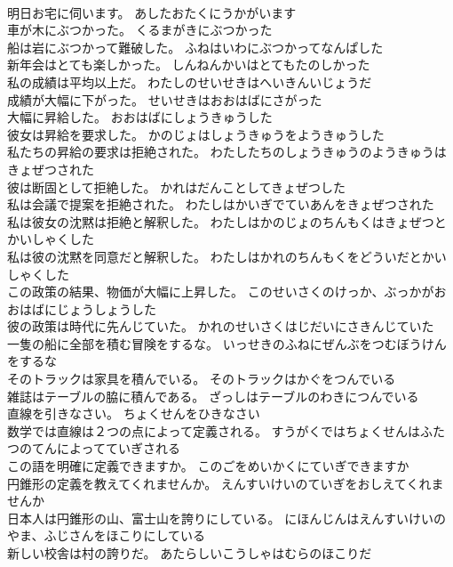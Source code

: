 \documentclass[8pt]{extreport}
\begin{document}
\begin{CJK}{UTF8}{min}
\\	明日お宅に伺います。	あしたおたくにうかがいます 
\\	車が木にぶつかった。	くるまがきにぶつかった 
\\	船は岩にぶつかって難破した。	ふねはいわにぶつかってなんぱした 
\\	新年会はとても楽しかった。	しんねんかいはとてもたのしかった 
\\	私の成績は平均以上だ。	わたしのせいせきはへいきんいじょうだ 
\\	成績が大幅に下がった。	せいせきはおおはばにさがった 
\\	大幅に昇給した。	おおはばにしょうきゅうした 
\\	彼女は昇給を要求した。	かのじょはしょうきゅうをようきゅうした 
\\	私たちの昇給の要求は拒絶された。	わたしたちのしょうきゅうのようきゅうはきょぜつされた 
\\	彼は断固として拒絶した。	かれはだんことしてきょぜつした 
\\	私は会議で提案を拒絶された。	わたしはかいぎでていあんをきょぜつされた 
\\	私は彼女の沈黙は拒絶と解釈した。	わたしはかのじょのちんもくはきょぜつとかいしゃくした 
\\	私は彼の沈黙を同意だと解釈した。	わたしはかれのちんもくをどういだとかいしゃくした 
\\	この政策の結果、物価が大幅に上昇した。	このせいさくのけっか、ぶっかがおおはばにじょうしょうした 
\\	彼の政策は時代に先んじていた。	かれのせいさくはじだいにさきんじていた 
\\	一隻の船に全部を積む冒険をするな。	いっせきのふねにぜんぶをつむぼうけんをするな 
\\	そのトラックは家具を積んでいる。	そのトラックはかぐをつんでいる 
\\	雑誌はテーブルの脇に積んである。	ざっしはテーブルのわきにつんでいる 
\\	直線を引きなさい。	ちょくせんをひきなさい 
\\	数学では直線は２つの点によって定義される。	すうがくではちょくせんはふたつのてんによってていぎされる 
\\	この語を明確に定義できますか。	このごをめいかくにていぎできますか 
\\	円錐形の定義を教えてくれませんか。	えんすいけいのていぎをおしえてくれませんか 
\\	日本人は円錐形の山、富士山を誇りにしている。	にほんじんはえんすいけいのやま、ふじさんをほこりにしている 
\\	新しい校舎は村の誇りだ。	あたらしいこうしゃはむらのほこりだ 

\end{CJK}
\end{document}
